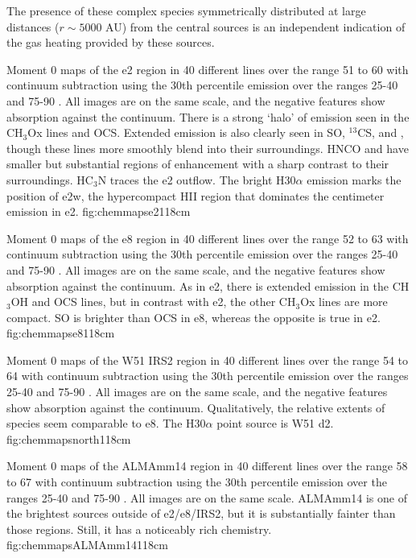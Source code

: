 \documentclass{aa}
\begin{document}
The presence of these complex species symmetrically distributed at large
distances ($r\sim5000$ AU) from the central sources is an independent indication
of the gas heating provided by these sources.

{Moment 0 maps of the e2 region in 40 different lines over the range 51 to 60
\kms with continuum subtraction using the 30th percentile emission
over the ranges 25-40 and 75-90 \kms.  All images are on the same scale, and
the negative features show absorption against the continuum.  There
is a strong `halo' of emission seen in the CH$_3$Ox lines and OCS.  Extended
emission is also clearly seen in SO, $^{13}$CS, and \formaldehyde, though these
lines more smoothly blend into their surroundings.  HNCO and \formamide have
smaller but substantial regions of enhancement with a sharp contrast to their
surroundings.  HC$_3$N traces the e2 outflow.  The bright H30$\alpha$ emission
marks the position of e2w, the hypercompact HII region that dominates the
centimeter emission in e2.
}{fig:chemmapse2}{1}{18cm}

{Moment 0 maps of the e8 region in 40 different lines over the range 52 to 63
\kms with continuum subtraction using the 30th percentile emission
over the ranges 25-40 and 75-90 \kms.  All images are on the same scale, and
the negative features show absorption against the continuum.  As in e2,
there is extended emission in the CH$_3$OH and OCS lines, but in contrast with e2,
the other CH$_3$Ox lines are more compact. SO is brighter than OCS in e8, 
whereas the opposite is true in e2.
}{fig:chemmapse8}{1}{18cm}

{Moment 0 maps of the W51 IRS2 region in 40 different lines over the range 54 to 64
\kms with continuum subtraction using the 30th percentile emission
over the ranges 25-40 and 75-90 \kms.  All images are on the same scale, and
the negative features show absorption against the continuum.  Qualitatively,
 the relative extents of species seem comparable to e8.  The H30$\alpha$ 
 point source is W51 d2.
}{fig:chemmapsnorth}{1}{18cm}

{Moment 0 maps of the ALMAmm14 region in 40 different lines over the range 58 to 67
\kms with continuum subtraction using the 30th percentile emission
over the ranges 25-40 and 75-90 \kms.  All images are on the same scale. 
ALMAmm14 is one of the brightest sources outside of e2/e8/IRS2, but
it is substantially fainter than those regions.  Still, it has a noticeably
rich chemistry.
}{fig:chemmapsALMAmm14}{1}{18cm}
\end{document}
